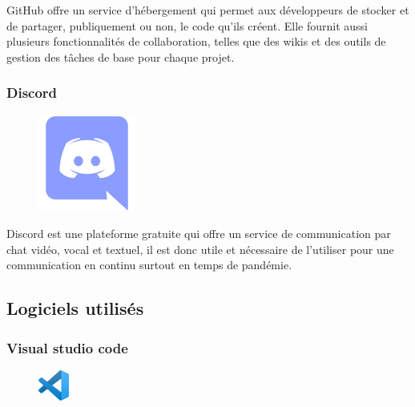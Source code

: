 GitHub offre un service d’hébergement 
qui permet aux développeurs de stocker et de partager, publiquement ou non, 
le code qu’ils créent. Elle fournit aussi plusieurs fonctionnalités de 
collaboration, telles que des wikis et des outils de gestion des tâches de base 
pour chaque projet\cite{40}.

\subsubsection*{Discord}
\begin{figure}
    \vspace{-22pt}
    \begin{center}
        \includegraphics[scale=0.36]{images/logo/discord.png}
        \label{fig65}
    \end{center}
    \vspace{-20pt}
    \vspace{-10pt}
\end{figure}

Discord est une plateforme gratuite qui offre un service de communication par 
chat vidéo, vocal et textuel, il est donc utile et nécessaire de l’utiliser pour 
une communication en continu surtout en temps de pandémie\cite{40}.

\subsection{Logiciels utilisés}
\subsubsection*{Visual studio code}
\begin{figure}
    \vspace{-20pt}
    \begin{center}
        \includegraphics[width=0.09\textwidth]{images/VSCode logo.png}
        \label{fig66}
    \end{center}
    \vspace{-20pt}
    \vspace{-10pt}
\end{figure}

